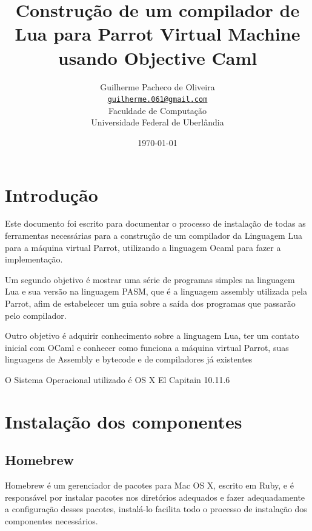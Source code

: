\documentclass[12pt,a4paper,twoside]{report}
\title{Construção de um compilador de Lua para Parrot Virtual Machine usando Objective Caml}
\date{}
\author{Guilherme Pacheco de Oliveira \\
\texttt{\small \url{guilherme.061@gmail.com}}
\vspace{1cm} \\
Faculdade de Computação \\
Universidade Federal de Uberlândia
}
\date{\today}
\begin{document}
  \maketitle
\listoffigures
\listoftables
\lstlistoflistings

\tableofcontents


\fancyhead[RE,LO]{\thesection}

\setlength{\parskip}{0.15in} %

\chapter{Introdução}
Este documento foi escrito para documentar o processo de instalação de
todas as ferramentas necessárias para a construção de um compilador da
Linguagem Lua para a máquina virtual Parrot, utilizando a linguagem
Ocaml para fazer a implementação.

Um segundo objetivo é mostrar uma série de programas simples na
linguagem Lua e sua versão na linguagem PASM, que é a linguagem
assembly utilizada pela Parrot, afim de estabelecer um guia sobre a
saída dos programas que passarão pelo compilador.

Outro objetivo é adquirir conhecimento sobre a linguagem Lua, ter um
contato inicial com OCaml e conhecer como funciona a máquina virtual
Parrot, suas linguagens de Assembly e bytecode e de compiladores já
existentes

O Sistema Operacional utilizado é OS X El Capitain 10.11.6

\chapter{Instalação dos componentes}
\section{Homebrew}
Homebrew é um gerenciador de pacotes para Mac OS X, escrito em Ruby, e
é responsável por instalar pacotes nos diretórios adequados e fazer
adequadamente a configuração desses pacotes, instalá-lo facilita todo
o processo de instalação dos componentes necessários.
\end{document}
